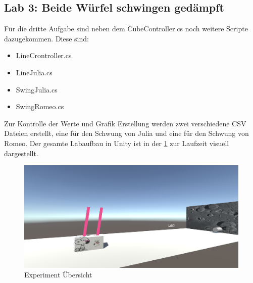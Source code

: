\documentclass[../main.tex]{subfiles}
\begin{document}
    \subsection{Lab 3: Beide Würfel schwingen gedämpft}
    Für die dritte Aufgabe sind neben dem CubeController.cs noch weitere Scripte dazugekommen. Diese sind:
    \begin {itemize}
        \item LineCrontroller.cs
        \item LineJulia.cs
        \item SwingJulia.cs
        \item SwingRomeo.cs
    \end{itemize}
    Zur Kontrolle der Werte und Grafik Erstellung werden zwei verschiedene CSV Dateien erstellt,
    eine für den Schwung von Julia und eine für den Schwung von Romeo.
    Der gesamte Labaufbau in Unity ist in der \ref{fig:3Lab_ExperimentOverview} zur Laufzeit visuell dargestellt.
    \newline

    \begin{figure}[H]
        \begin{center}
            \centerline{\includegraphics[width=155mm]{./images/3Lab_Experiment_Overview}}
            \caption{Experiment Übersicht}
            \label{fig:3Lab_ExperimentOverview}
        \end{center}
    \end{figure}
\end{document}
